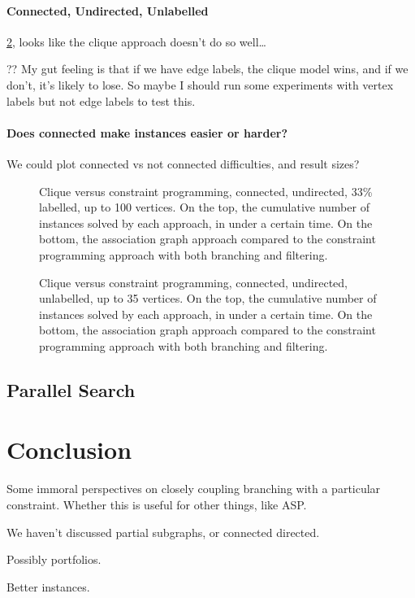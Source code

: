\documentclass{llncs}
\begin{document}
\paragraph{Connected, Undirected, Unlabelled} \cref{figure:connected-plain}, looks like the clique
approach doesn't do so well\ldots

?? My gut feeling is that if we have edge labels, the clique model wins, and if we don't, it's
likely to lose. So maybe I should run some experiments with vertex labels but not edge labels to
test this.

\paragraph{Does connected make instances easier or harder?} We could plot connected vs not connected
difficulties, and result sizes?

\begin{figure}[p]
    \centering
    \caption{Clique versus constraint programming, connected, undirected, 33\% labelled, up to 100 vertices. On the top,
        the cumulative number of instances solved by each approach, in under a certain time. On the
        bottom, the association graph approach compared to the constraint programming approach with
        both branching and filtering.} \label{figure:connected-undir33}
\end{figure}

\begin{figure}[p]
    \centering
    \caption{Clique versus constraint programming, connected, undirected, unlabelled, up to 35 vertices. On the top, the
        cumulative number of instances solved by each approach, in under a certain time. On the
        bottom, the association graph approach compared to the constraint programming approach
    with both branching and filtering.}
\label{figure:connected-plain}
\end{figure}

\subsection{Parallel Search}

\cite{DBLP:conf/ictai/MinotNS15}

\section{Conclusion}

Some immoral perspectives on closely coupling branching with a particular constraint. Whether this
is useful for other things, like ASP.

We haven't discussed partial subgraphs, or connected directed.

Possibly portfolios.

Better instances.



\end{document}
